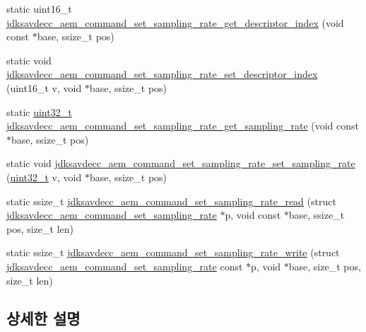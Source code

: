 \begin{DoxyCompactItemize}
\item 
static uint16\+\_\+t \hyperlink{group__command__set__sampling__rate_ga06e493dfcb568cb8c720dec39d89b8eb}{jdksavdecc\+\_\+aem\+\_\+command\+\_\+set\+\_\+sampling\+\_\+rate\+\_\+get\+\_\+descriptor\+\_\+index} (void const $\ast$base, ssize\+\_\+t pos)
\item 
static void \hyperlink{group__command__set__sampling__rate_gadb7c59db345d4db587992ea4798f41eb}{jdksavdecc\+\_\+aem\+\_\+command\+\_\+set\+\_\+sampling\+\_\+rate\+\_\+set\+\_\+descriptor\+\_\+index} (uint16\+\_\+t v, void $\ast$base, ssize\+\_\+t pos)
\item 
static \hyperlink{parse_8c_a6eb1e68cc391dd753bc8ce896dbb8315}{uint32\+\_\+t} \hyperlink{group__command__set__sampling__rate_ga94e93a8fcb6a9d86b529a8d1fc3f906c}{jdksavdecc\+\_\+aem\+\_\+command\+\_\+set\+\_\+sampling\+\_\+rate\+\_\+get\+\_\+sampling\+\_\+rate} (void const $\ast$base, ssize\+\_\+t pos)
\item 
static void \hyperlink{group__command__set__sampling__rate_ga1acd652b461a2d1a6602c71bfd7ca257}{jdksavdecc\+\_\+aem\+\_\+command\+\_\+set\+\_\+sampling\+\_\+rate\+\_\+set\+\_\+sampling\+\_\+rate} (\hyperlink{parse_8c_a6eb1e68cc391dd753bc8ce896dbb8315}{uint32\+\_\+t} v, void $\ast$base, ssize\+\_\+t pos)
\item 
static ssize\+\_\+t \hyperlink{group__command__set__sampling__rate_gaeb327673ea740fd1308128acd889cc87}{jdksavdecc\+\_\+aem\+\_\+command\+\_\+set\+\_\+sampling\+\_\+rate\+\_\+read} (struct \hyperlink{structjdksavdecc__aem__command__set__sampling__rate}{jdksavdecc\+\_\+aem\+\_\+command\+\_\+set\+\_\+sampling\+\_\+rate} $\ast$p, void const $\ast$base, ssize\+\_\+t pos, size\+\_\+t len)
\item 
static ssize\+\_\+t \hyperlink{group__command__set__sampling__rate_gac9594b53d8732b74a34380328a482323}{jdksavdecc\+\_\+aem\+\_\+command\+\_\+set\+\_\+sampling\+\_\+rate\+\_\+write} (struct \hyperlink{structjdksavdecc__aem__command__set__sampling__rate}{jdksavdecc\+\_\+aem\+\_\+command\+\_\+set\+\_\+sampling\+\_\+rate} const $\ast$p, void $\ast$base, size\+\_\+t pos, size\+\_\+t len)
\end{DoxyCompactItemize}


\subsection{상세한 설명}


